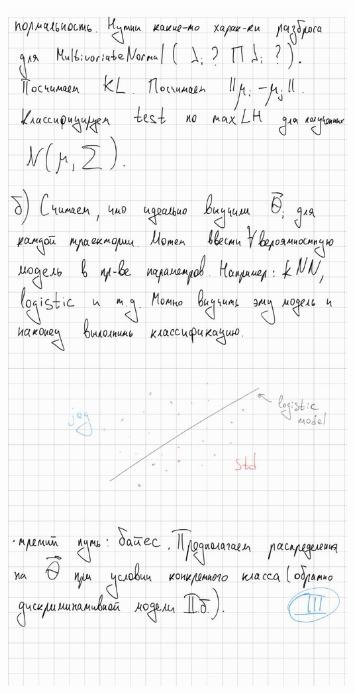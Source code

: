 \documentclass[referee, pdflatex, sn-mathphys-num]{sn-jnl}
\theoremstyle{definition}
\theoremstyle{plain}
\begin{document}
	\begin{figure}[h]
		\centering
		\includegraphics[width=0.8\textwidth]{imgs/photo_4_2024-12-13_23-46-45}
	\end{figure}
	
	
	
 
\end{document}
